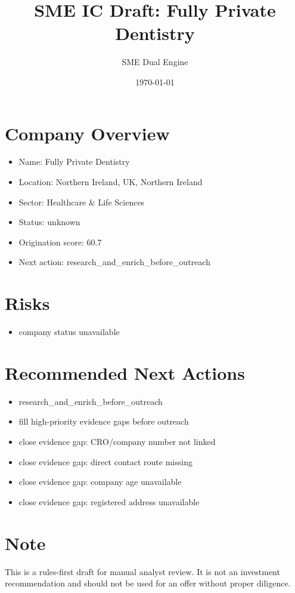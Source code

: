 \documentclass[11pt,a4paper]{article}
\title{SME IC Draft: Fully Private Dentistry}
\author{SME Dual Engine}
\date{\today}
\begin{document}
\maketitle
\section*{Company Overview}
\begin{itemize}[leftmargin=1.4em]
\item Name: Fully Private Dentistry
\item Location: Northern Ireland, UK, Northern Ireland
\item Sector: Healthcare \& Life Sciences
\item Status: unknown
\item Origination score: 60.7
\item Next action: research\_and\_enrich\_before\_outreach
\end{itemize}
\section*{Risks}
\begin{itemize}[leftmargin=1.4em]
\item company status unavailable
\end{itemize}
\section*{Recommended Next Actions}
\begin{itemize}[leftmargin=1.4em]
\item research\_and\_enrich\_before\_outreach
\item fill high-priority evidence gaps before outreach
\item close evidence gap: CRO/company number not linked
\item close evidence gap: direct contact route missing
\item close evidence gap: company age unavailable
\item close evidence gap: registered address unavailable
\end{itemize}
\section*{Note}
This is a rules-first draft for manual analyst review. It is not an investment
recommendation and should not be used for an offer without proper diligence.
\end{document}
